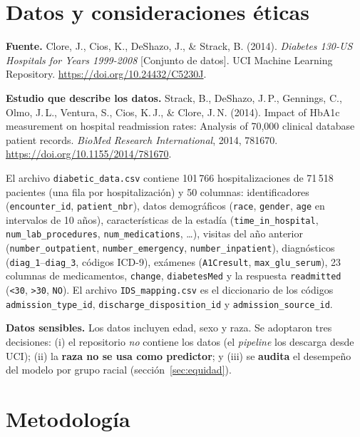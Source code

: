 \documentclass[11pt,a4paper]{article}
\newcommand{\cod}[1]{\texttt{#1}}
\begin{document}
\section{Datos y consideraciones éticas}
\textbf{Fuente.} Clore, J., Cios, K., DeShazo, J., \& Strack, B. (2014). \emph{Diabetes 130-US Hospitals for Years 1999-2008} [Conjunto de datos]. UCI Machine Learning Repository. \url{https://doi.org/10.24432/C5230J}.

\textbf{Estudio que describe los datos.} Strack, B., DeShazo, J.\,P., Gennings, C., Olmo, J.\,L., Ventura, S., Cios, K.\,J., \& Clore, J.\,N. (2014). Impact of HbA1c measurement on hospital readmission rates: Analysis of 70,000 clinical database patient records. \emph{BioMed Research International}, 2014, 781670. \url{https://doi.org/10.1155/2014/781670}.

El archivo \cod{diabetic_data.csv} contiene 101\,766 hospitalizaciones de 71\,518 pacientes (una fila por hospitalización) y 50 columnas: identificadores (\cod{encounter\_id}, \cod{patient\_nbr}), datos demográficos (\cod{race}, \cod{gender}, \cod{age} en intervalos de 10 años), características de la estadía (\cod{time\_in\_hospital}, \cod{num\_lab\_procedures}, \cod{num\_medications}, \dots), visitas del año anterior (\cod{number\_outpatient}, \cod{number\_emergency}, \cod{number\_inpatient}), diagnósticos (\cod{diag\_1}--\cod{diag\_3}, códigos ICD-9), exámenes (\cod{A1Cresult}, \cod{max\_glu\_serum}), 23 columnas de medicamentos, \cod{change}, \cod{diabetesMed} y la respuesta \cod{readmitted} (\cod{<30}, \cod{>30}, \cod{NO}). El archivo \cod{IDS\_mapping.csv} es el diccionario de los códigos \cod{admission\_type\_id}, \cod{discharge\_disposition\_id} y \cod{admission\_source\_id}.

\textbf{Datos sensibles.} Los datos incluyen edad, sexo y raza. Se adoptaron tres decisiones: (i) el repositorio \emph{no} contiene los datos (el \emph{pipeline} los descarga desde UCI); (ii) la \textbf{raza no se usa como predictor}; y (iii) se \textbf{audita} el desempeño del modelo por grupo racial (sección~\ref{sec:equidad}).

\section{Metodología}\label{sec:metodo}
\end{document}
